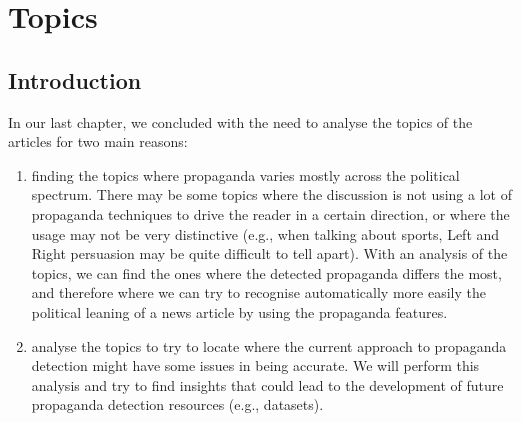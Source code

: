 \chapter{\statusorange Topics}
\label{chap:topics}

\section{Introduction}






In our last chapter, we concluded with the need to analyse the topics of the articles for two main reasons:

\begin{enumerate}
    \item finding the topics where propaganda varies mostly across the political spectrum. There may be some topics where the discussion is not using a lot of propaganda techniques to drive the reader in a certain direction, or where the usage may not be very distinctive (e.g., when talking about sports, Left and Right persuasion may be quite difficult to tell apart). With an analysis of the topics, we can find the ones where the detected propaganda differs the most, and therefore where we can try to recognise automatically more easily the political leaning of a news article by using the propaganda features.
    \item analyse the topics to try to locate where the current approach to propaganda detection might have some issues in being accurate. We will perform this analysis and try to find insights that could lead to the development of future propaganda detection resources (e.g., datasets).
\end{enumerate}

